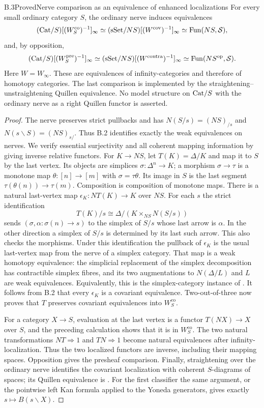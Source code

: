 \begin{claim}{B.3}{Proved}{Nerve comparison as an equivalence of enhanced localizations}
For every small ordinary category $S$, the ordinary nerve induces equivalences
\[
 (\mathrm{Cat}/S)[(W^{\mathrm{co}}_S)^{-1}]_\infty
 \simeq (\mathrm{sSet}/NS)[(W^{\mathrm{cov}})^{-1}]_\infty
 \simeq\mathrm{Fun}(NS,\mathcal S),
\]
and, by opposition,
\[
 (\mathrm{Cat}/S)[(W^{\mathrm{pre}}_S)^{-1}]_\infty
 \simeq (\mathrm{sSet}/NS)[(W^{\mathrm{contra}})^{-1}]_\infty
 \simeq\mathrm{Fun}(NS^{\mathrm{op}},\mathcal S).
\]
Here $W=W_\infty$. These are equivalences of infinity-categories and therefore
of homotopy categories. The last comparison is implemented by the
straightening--unstraightening Quillen equivalence. No model structure on
$\mathrm{Cat}/S$ with the ordinary nerve as a right Quillen functor is asserted.
\end{claim}
\begin{proof}
The nerve preserves strict pullbacks and has
$N(S/s)=(NS)_{/s}$ and $N(s\backslash S)=(NS)_{s/}$. Thus B.2 identifies
exactly the weak equivalences on nerves. We verify essential surjectivity and
all coherent mapping information by giving inverse relative functors.
For $K\to NS$, let $T(K)=\Delta/K$ and map it to $S$ by the last vertex.
Its objects are simplices $\sigma:\Delta^n\to K$; a morphism
$\sigma\to\tau$ is a monotone map $\theta:[n]\to[m]$ with
$\sigma=\tau\theta$. Its image in $S$ is the last segment
$\tau(\theta(n))\to\tau(m)$. Composition is composition of monotone maps.
There is a natural last-vertex map $\epsilon_K:NT(K)\to K$ over $NS$.
For each $s$ the strict identification
\[
 T(K)/s\cong\Delta/(K\times_{NS}N(S/s))
\]
sends $(\sigma,\alpha:\sigma(n)\to s)$ to the simplex of $S/s$ whose last
arrow is $\alpha$. In the other direction a simplex of $S/s$ is determined
by its last such arrow. This also checks the morphisms.
Under this identification the pullback of $\epsilon_K$ is the usual
last-vertex map from the nerve of a simplex category. That map is a weak
homotopy equivalence: the simplicial replacement of the simplex decomposition
has contractible simplex fibres, and its two augmentations to
$N(\Delta/L)$ and $L$ are weak equivalences. Equivalently, this is the
simplex-category instance of \citet[Proposition 7.3.8 and Examples 7.3.9--7.3.10]{BCCisinski2019}.
It follows from B.2 that every $\epsilon_K$ is a covariant equivalence.
Two-out-of-three now proves that $T$ preserves covariant equivalences into
$W^{\mathrm{co}}_S$.

For a category $X\to S$, evaluation at the last vertex is a functor
$T(NX)\to X$ over $S$, and the preceding calculation shows that it is in
$W^{\mathrm{co}}_S$. The two natural transformations
$NT\Rightarrow1$ and $TN\Rightarrow1$ become natural equivalences after
infinity-localization. Thus the two localized functors are inverse, including
their mapping spaces. Opposition gives the presheaf comparison. Finally,
straightening over the ordinary nerve identifies the covariant localization
with coherent $S$-diagrams of spaces; its Quillen equivalence is
\citet[Theorem 2.2.1.2]{DGLurieHTT}. For the first classifier the same
argument, or the pointwise left Kan formula applied to the Yoneda generators,
gives exactly $s\mapsto B(s\backslash X)$.
\end{proof}

